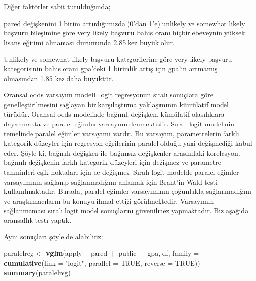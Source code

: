 \documentclass[
]{book}
\newenvironment{Shaded}{\begin{snugshade}}{\end{snugshade}}
\newcommand{\DataTypeTok}[1]{\textcolor[rgb]{0.13,0.29,0.53}{#1}}
\newcommand{\KeywordTok}[1]{\textcolor[rgb]{0.13,0.29,0.53}{\textbf{#1}}}
\newcommand{\NormalTok}[1]{#1}
\newcommand{\OperatorTok}[1]{\textcolor[rgb]{0.81,0.36,0.00}{\textbf{#1}}}
\newcommand{\OtherTok}[1]{\textcolor[rgb]{0.56,0.35,0.01}{#1}}
\newcommand{\StringTok}[1]{\textcolor[rgb]{0.31,0.60,0.02}{#1}}
\begin{document}
Diğer faktörler sabit tutulduğunda;

pared değişkenini 1 birim artırdığımızda (0'dan 1'e) unlikely ve somewhat likely başvuru bileşimine göre very likely başvuru bahis oranı hiçbir ebeveynin yüksek lisans eğitimi almaması durumunda 2.85 kez büyük olur.

Unlikely ve somewhat likely başvuru kategorilerine göre very likely başvuru kategorisinin bahis oranı gpa'deki 1 birimlik artış için gpa'in artmamış olmasından 1.85 kez daha büyüktür.

Oransal odds varsayım modeli, logit regresyonun sıralı sonuçlara göre genelleştirilmesini sağlayan bir karşılaştırma yaklaşımının kümülatif model türüdür. Oransal odds modelinde bağımlı değişken, kümülatif olasılıklara dayanmakta ve paralel eğimler varsayımı denmektedir. Sıralı logit modelinin temelinde paralel eğimler varsayımı vardır. Bu varsayım, parametrelerin farklı kategorik düzeyler için regresyon eğrilerinin paralel olduğu yani değişmediği kabul eder. Şöyle ki, bağımlı değişken ile bağımsız değişkenler arasındaki korelasyon, bağımlı değişkenin farklı kategorik düzeyleri için değişmez ve parametre tahminleri eşik noktaları için de değişmez. Sıralı logit modelde paralel eğimler varsayımının sağlanıp sağlanmadığını anlamak için Brant'in Wald testi kullanılmaktadır. Burada, paralel eğimler varsayımının çoğunlukla sağlanmadığını ve araştırmacıların bu konuyu ihmal ettiği görülmektedir. Varsayımın sağlanmaması sıralı logit model sonuçlarını güvenilmez yapmaktadır. Biz aşağıda oransallık testi yaptık.

Aynı sonuçları şöyle de alabiliriz:

\begin{Shaded}
\begin{Highlighting}[]
\NormalTok{paralelreg <-}\StringTok{ }\KeywordTok{vglm}\NormalTok{(apply }\OperatorTok{~}\StringTok{ }\NormalTok{pared }\OperatorTok{+}\StringTok{ }\NormalTok{public }\OperatorTok{+}\StringTok{ }\NormalTok{gpa, df, }\DataTypeTok{family =} \KeywordTok{cumulative}\NormalTok{(}\DataTypeTok{link =} \StringTok{"logit"}\NormalTok{, }\DataTypeTok{parallel =} \OtherTok{TRUE}\NormalTok{, }\DataTypeTok{reverse =} \OtherTok{TRUE}\NormalTok{))}
\KeywordTok{summary}\NormalTok{(paralelreg)}
\end{Highlighting}
\end{Shaded}
\end{document}
